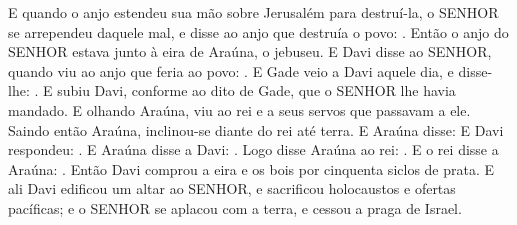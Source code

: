 {  E quando o anjo estendeu sua mão sobre Jerusalém para destruí-la, o SENHOR se arrependeu daquele mal, e disse ao anjo que destruía o povo: . Então o anjo do SENHOR estava junto à eira de Araúna, o jebuseu.
  E Davi disse ao SENHOR, quando viu ao anjo que feria ao povo: .
  E Gade veio a Davi aquele dia, e disse-lhe: . %
  E subiu Davi, conforme ao dito de Gade, que o SENHOR lhe havia mandado.
  E olhando Araúna, viu ao rei e a seus servos que passavam a ele. Saindo então Araúna, inclinou-se diante do rei até terra.
  E Araúna disse:  E Davi respondeu: .
  E Araúna disse a Davi: . Logo disse Araúna ao rei: .
  E o rei disse a Araúna: . Então Davi comprou a eira e os bois por cinquenta siclos de prata.
  E ali Davi edificou um altar ao SENHOR, e sacrificou holocaustos e ofertas pacíficas; e o SENHOR se aplacou com a terra, e cessou a praga de Israel.
\par }

